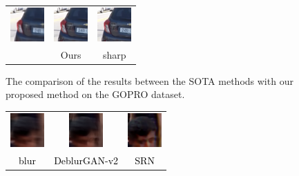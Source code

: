\begin{sloppypar}
\begin{figure}
\begin{tabular}{ccc}
                \includegraphics[width=1.3cm,height=1.3cm]{./gopro2/GOPR0854_11_00_000005_2_1_AD.png} &
                \includegraphics[width=1.3cm,height=1.3cm]{./gopro2/GOPR0854_11_00_000005_ours_2_1.png} &    \includegraphics[width=1.3cm,height=1.3cm]{./gopro2/GOPR0854_11_00_000005_2_1_sharp.png}    \\
                \textcolor{black}{\cite{26}} & Ours & sharp \\
                
        \end{tabular}
        \caption{The comparison of the results between the SOTA  methods with our proposed method on the GOPRO dataset.}
        \label{figure8}
        \vspace{-0.5em}
\end{figure}

\begin{figure}
        \center
        \scriptsize
        \begin{tabular}{ccc}
                \includegraphics[width=1.3cm,height=1.3cm]{./gopro1/GOPR0384_11_05_004004_3_5.png} &    \includegraphics[width=1.3cm,height=1.3cm]{./gopro1/GOPR0384_11_05_004004_D-GAN2_3_5.png} &    \includegraphics[width=1.3cm,height=1.3cm]{./gopro1/GOPR0384_11_05_004004_SRN_3_5.png}       \\
                \textcolor{black}{blur} & \textcolor{black}{DeblurGAN-v2} & \textcolor{black}{SRN} \\
                

\end{tabular}
\end{figure}
\end{sloppypar}
